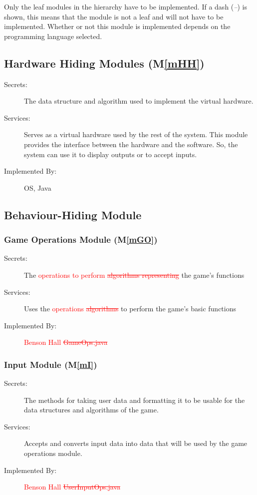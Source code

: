 \documentclass[12pt, titlepage]{article}
\newcommand{\mref}[1]{M\ref{#1}}
\begin{document}
Only the leaf modules in the
hierarchy have to be implemented. If a dash (\emph{--}) is shown, this means
that the module is not a leaf and will not have to be implemented. Whether or
not this module is implemented depends on the programming language
selected.

\subsection{Hardware Hiding Modules (\mref{mHH})}

\begin{description}
    \item[Secrets:]The data structure and algorithm used to implement the virtual
      hardware.
    \item[Services:]Serves as a virtual hardware used by the rest of the system. This module provides the interface between the hardware and the software. So, the system can use it to display outputs or to accept inputs.
    \item[Implemented By:] OS, Java
\end{description}

\subsection{Behaviour-Hiding Module}

\subsubsection{Game Operations Module (\mref{mGO})}
\begin{description}
    \item[Secrets:]The \textcolor{red}{operations to perform \sout{algorithms representing}} the game's functions
    \item[Services:]Uses the \textcolor{red}{operations \sout{algorithms}} to perform the game's basic functions 
    \item[Implemented By:]\textcolor{red}{Benson Hall \sout{GameOps.java}}
\end{description}

\subsubsection{Input Module (\mref{mI})}

\begin{description}
    \item[Secrets:]The methods for taking user data and formatting it to be usable for the data structures and algorithms of the game.
    \item[Services:]Accepts and converts input data into data that will be used by the game operations module.
    \item[Implemented By:]\textcolor{red}{Benson Hall \sout{UserInputOps.java}}
\end{description}
\end{document}
